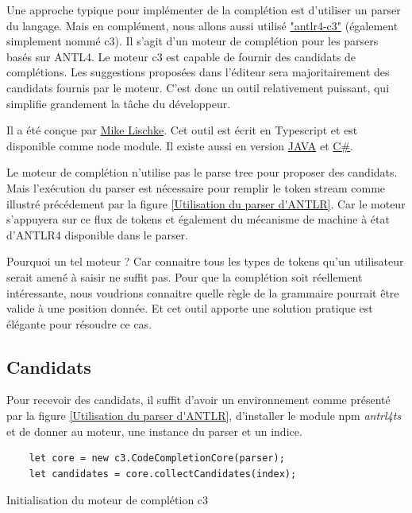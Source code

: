 \documentclass[
    iict, %
    il, %
]{heig-tb}
\begin{document}
Une approche typique pour implémenter de la complétion est d'utiliser un parser du langage.
Mais en complément, nous allons aussi utilisé \href{https://github.com/mike-lischke/antlr4-c3}{"antlr4-c3"} (également simplement nommé c3).
Il s'agit d'un moteur de complétion pour les parsers basés sur ANTL4. Le moteur c3 est capable de fournir des candidats de complétions.
Les suggestions proposées dans l'éditeur sera majoritairement des candidats fournis par le moteur. C'est donc un outil relativement puissant, qui simplifie grandement la tâche du développeur.

Il a été conçue par \href{https://github.com/mike-lischke}{Mike Lischke}. Cet outil est écrit en Typescript et est disponible comme node module. Il existe aussi en version \href{https://github.com/mike-lischke/antlr4-c3/tree/master/ports/java}{JAVA} et \href{https://github.com/mike-lischke/antlr4-c3/tree/master/ports/c%23}{C\#}.

Le moteur de complétion n'utilise pas le parse tree pour proposer des candidats. Mais l'exécution du parser est nécessaire pour remplir le token stream comme illustré précédement par la figure \ref{Utilisation du parser d'ANTLR}.
Car le moteur s'appuyera sur ce flux de tokens et également du mécanisme de machine à état d'ANTLR4 disponible dans le parser. \cite{antlr-mega-tutorial}

Pourquoi un tel moteur ?
Car connaitre tous les types de tokens qu'un utilisateur serait amené à saisir ne suffit pas. Pour que la complétion soit réellement intéressante, nous voudrions connaitre quelle règle de la grammaire pourrait être valide à une position donnée.
Et cet outil apporte une solution pratique est élégante pour résoudre ce cas.

\subsection{Candidats}\label{candidates}

Pour recevoir des candidats, il suffit d'avoir un environnement comme présenté par la figure \ref{Utilisation du parser d'ANTLR}, d'installer le module npm \emph{antrl4ts} et
de donner au moteur, une instance du parser et un indice.

\begin{listing}[!ht]
    \begin{verbatim}
    let core = new c3.CodeCompletionCore(parser);
    let candidates = core.collectCandidates(index);
    \end{verbatim}
    \caption{Initialisation du moteur de complétion c3}
    \label{c3-setup}
\end{listing}
\end{document}
